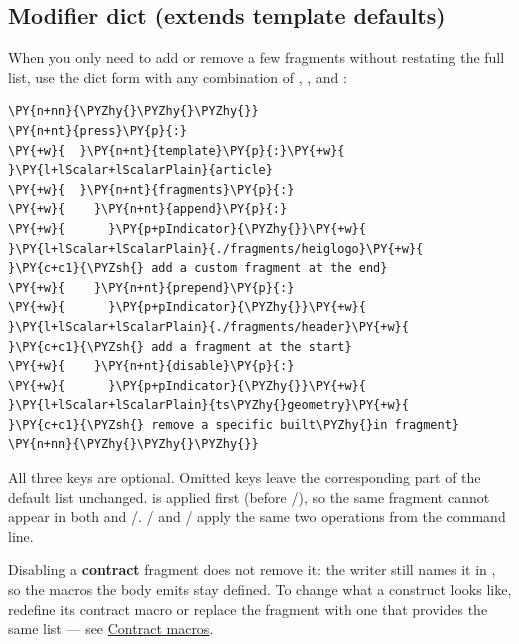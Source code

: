 \documentclass[a4paper,twoside]{article}
\begin{document}
\subsection{Modifier dict (extends template defaults)}
When you only need to add or remove a few fragments without restating the full
list, use the dict form with any combination of , , and
:
\begin{tscode}[lang=yaml, engine=pygments]
\begin{Verbatim}[commandchars=\\\{\},breaklines, breakanywhere, commandchars=\\\{\}]
\PY{n+nn}{\PYZhy{}\PYZhy{}\PYZhy{}}
\PY{n+nt}{press}\PY{p}{:}
\PY{+w}{  }\PY{n+nt}{template}\PY{p}{:}\PY{+w}{ }\PY{l+lScalar+lScalarPlain}{article}
\PY{+w}{  }\PY{n+nt}{fragments}\PY{p}{:}
\PY{+w}{    }\PY{n+nt}{append}\PY{p}{:}
\PY{+w}{      }\PY{p+pIndicator}{\PYZhy{}}\PY{+w}{ }\PY{l+lScalar+lScalarPlain}{./fragments/heiglogo}\PY{+w}{   }\PY{c+c1}{\PYZsh{} add a custom fragment at the end}
\PY{+w}{    }\PY{n+nt}{prepend}\PY{p}{:}
\PY{+w}{      }\PY{p+pIndicator}{\PYZhy{}}\PY{+w}{ }\PY{l+lScalar+lScalarPlain}{./fragments/header}\PY{+w}{     }\PY{c+c1}{\PYZsh{} add a fragment at the start}
\PY{+w}{    }\PY{n+nt}{disable}\PY{p}{:}
\PY{+w}{      }\PY{p+pIndicator}{\PYZhy{}}\PY{+w}{ }\PY{l+lScalar+lScalarPlain}{ts\PYZhy{}geometry}\PY{+w}{            }\PY{c+c1}{\PYZsh{} remove a specific built\PYZhy{}in fragment}
\PY{n+nn}{\PYZhy{}\PYZhy{}\PYZhy{}}
\end{Verbatim}
\end{tscode}
All three keys are optional. Omitted keys leave the corresponding part of the
default list unchanged.  is applied first (before /),
so the same fragment cannot appear in both  and /.
 /  and  /  apply the same two
operations from the command line.

Disabling a \textbf{contract} fragment does not remove it: the writer still names it
in , so the macros the body emits stay defined. To change
what a construct looks like, redefine its contract macro or replace the
fragment with one that provides the same list --- see
\href{partials.md\#overriding-a-construct}{Contract macros}.
\end{document}
